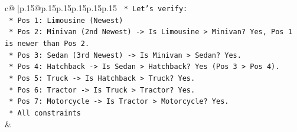 \documentclass{article}
\begin{document}
{\begin{supertabular}{c@{$\;$}|p{.15\linewidth}@{}p{.15\linewidth}p{.15\linewidth}p{.15\linewidth}p{.15\linewidth}p{.15\linewidth}}
{{{\texttt{    *   Let's verify:} \\
\texttt{        *   Pos 1: Limousine (Newest)} \\
\texttt{        *   Pos 2: Minivan (2nd Newest) {-}> Is Limousine > Minivan? Yes, Pos 1 is newer than Pos 2.} \\
\texttt{        *   Pos 3: Sedan (3rd Newest) {-}> Is Minivan > Sedan? Yes.} \\
\texttt{        *   Pos 4: Hatchback {-}> Is Sedan > Hatchback? Yes (Pos 3 > Pos 4).} \\
\texttt{        *   Pos 5: Truck {-}> Is Hatchback > Truck? Yes.} \\
\texttt{        *   Pos 6: Tractor {-}> Is Truck > Tractor? Yes.} \\
\texttt{        *   Pos 7: Motorcycle {-}> Is Tractor > Motorcycle? Yes.} \\
\texttt{    *   All constraints} \\
            }
        }
    }
    & \\ \\

\end{supertabular}
}
\end{document}
